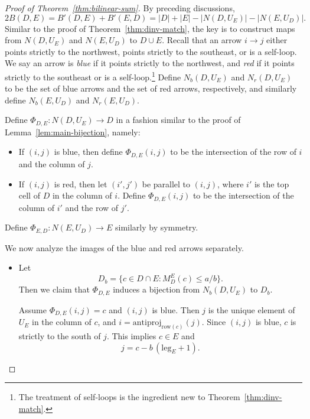 \documentclass[11pt,reqno]{amsart}
\theoremstyle{remark}
\begin{document}
\begin{proof}
    [Proof of Theorem~\ref{thm:bilinear-sum}]
    By preceding discussions, 
    \[ 2B(D,E)=B'(D,E)+B'(E,D)=|D|+|E|-|N(D,U_E)|-|N(E,U_D)|.\]
    Similar to the proof of Theorem~\ref{thm:dinv-match}, the key is to construct maps from $N(D,U_E)$ and $N(E,U_D)$ to $D\cup E$. Recall that an arrow $i\to j$ either points strictly to the northwest, points strictly to the southeast, or is a self-loop. We say an arrow is \emph{blue} if it points strictly to the northwest, and \emph{red} if it points strictly to the southeast or is a self-loop.\footnote{The treatment of self-loops is the ingredient new to Theorem~\ref{thm:dinv-match}.} Define $N_b(D,U_E)$ and $N_r(D,U_E)$ to be the set of blue arrows and the set of red arrows, respectively, and similarly define $N_b(E,U_D)$ and $N_r(E,U_D)$.

    Define $\Phi_{D,E}:N(D,U_E)\to D$ in a fashion similar to the proof of Lemma~\ref{lem:main-bijection}, namely:
    \begin{itemize}
    \item If $(i,j)$ is blue, then define $\Phi_{D,E}(i,j)$ to be the intersection of the row of $i$ and the column of $j$.
    \item If $(i,j)$ is red, then let $(i',j')$ be parallel to $(i,j)$, where $i'$ is the top cell of $D$ in the column of $i$. Define $\Phi_{D,E}(i,j)$ to be the intersection of the column of $i'$ and the row of $j'$.
    \end{itemize}  
    Define $\Phi_{E,D}:N(E,U_D)\to E$ similarly by symmetry.

    

    \medskip

    We now analyze the images of the blue and red arrows separately.

    

    \medskip

    \begin{itemize}
        \item Let 
        \[ D_b=\{c\in D\cap E:M^E_D(c)\leq a/b\}.\]
        Then we claim that $\Phi_{D,E}$ induces a bijection from $N_b(D,U_E)$ to $D_b$.
        
        Assume $\Phi_{D,E}(i,j)=c$ and $(i,j)$ is blue. Then $j$ is the unique element of $U_E$ in the column of $c$, and $i=\mathrm{antiproj}_{\mathrm{row}(c)}(j)$. Since $(i,j)$ is blue, $c$ is strictly to the south of $j$. This implies $c\in E$ and 
        \[j=c-b\,(\mathrm{leg}_E+1).\]
         

\end{itemize}
\end{proof}
\end{document}

